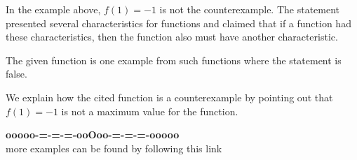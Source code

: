 \documentclass{ximera}
\begin{document}
In the example above, $f(1) = -1$ is not the counterexample. The statement presented several characteristics for functions and claimed that if a function had these characteristics, then the function also must have another characteristic.

The given function is one example from such functions where the statement is false.

We explain how the cited function is a counterexample by pointing out that $f(1) = -1$ is not a maximum value for the function.



























\begin{onlineOnly}
\begin{center}
\textbf{\textcolor{green!50!black}{ooooo-=-=-=-ooOoo-=-=-=-ooooo}} \\

more examples can be found by following this link\\ 

\end{center}
\end{onlineOnly}
\end{document}
